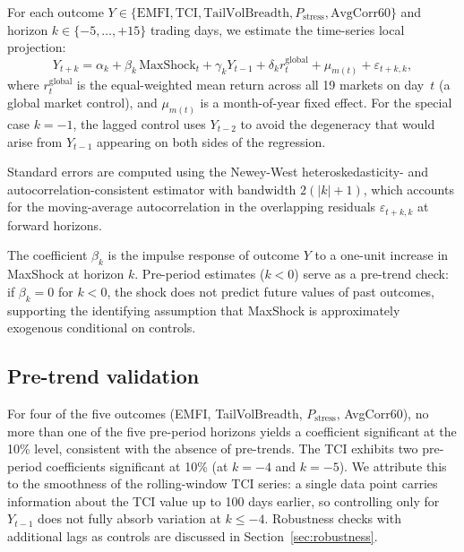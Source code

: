 \documentclass[11pt]{article}
\begin{document}
For each outcome $Y \in \{\text{EMFI}, \text{TCI}, \text{TailVolBreadth},
P_{\text{stress}}, \text{AvgCorr60}\}$ and horizon $k \in \{-5, \ldots, +15\}$
trading days, we estimate the time-series local projection:
\begin{equation}
  Y_{t+k} = \alpha_k + \beta_k \, \text{MaxShock}_t
           + \gamma_k Y_{t-1}
           + \delta_k r^{\text{global}}_t
           + \mu_{m(t)}
           + \varepsilon_{t+k,k},
  \label{eq:lp}
\end{equation}
where $r^{\text{global}}_t$ is the equal-weighted mean return across all 19
markets on day~$t$ (a global market control), and $\mu_{m(t)}$ is a
month-of-year fixed effect.
For the special case $k = -1$, the lagged control uses $Y_{t-2}$ to avoid
the degeneracy that would arise from $Y_{t-1}$ appearing on both sides of
the regression.

Standard errors are computed using the Newey-West \citeyearpar{neweywest1987}
heteroskedasticity- and autocorrelation-consistent estimator with bandwidth
$2(|k|+1)$, which accounts for the moving-average autocorrelation in the
overlapping residuals $\varepsilon_{t+k,k}$ at forward horizons.

The coefficient $\beta_k$ is the impulse response of outcome $Y$ to a
one-unit increase in MaxShock at horizon $k$.
Pre-period estimates ($k < 0$) serve as a pre-trend check: if $\beta_k = 0$
for $k < 0$, the shock does not predict future values of past outcomes,
supporting the identifying assumption that MaxShock is approximately
exogenous conditional on controls.

\subsection{Pre-trend validation}
\label{subsec:pretrends}

For four of the five outcomes (EMFI, TailVolBreadth, $P_{\text{stress}}$,
AvgCorr60), no more than one of the five pre-period horizons yields a
coefficient significant at the 10\% level, consistent with the absence of
pre-trends.
The TCI exhibits two pre-period coefficients significant at 10\% (at
$k = -4$ and $k = -5$).
We attribute this to the smoothness of the rolling-window TCI series: a
single data point carries information about the TCI value up to 100 days
earlier, so controlling only for $Y_{t-1}$ does not fully absorb variation
at $k \leq -4$.
Robustness checks with additional lags as controls are discussed in
Section~\ref{sec:robustness}.
\end{document}
